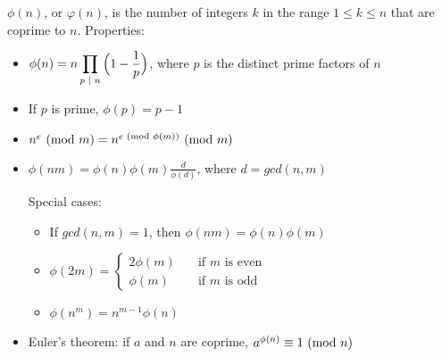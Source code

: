 
$\phi (n)$, or $\varphi (n)$, is the number of integers $k$ in the range $1 \leq k \leq n$ that are coprime to $n$. Properties:
\begin{itemize}
    \item ${\displaystyle \phi (n) = n \prod_{p \text{ } | \text{ } n} \Big(1 - \frac{1}{p} \Big)}$, where $p$ is the distinct prime factors of $n$
    \item If $p$ is prime, $\phi (p) = p-1$
    \item $n^e \text{ } ( \text{mod } m ) = n^{e \text{ } ( \text{mod } \phi(m) )} \text{ } ( \text{mod } m )$
    \item $\phi (nm) = \phi (n) \phi (m) \frac{d}{\phi (d)}$, where $d = gcd(n, m)$
    
    Special cases:
    \begin{itemize}
        \item If $gcd(n, m) = 1$, then $\phi (nm) = \phi (n) \phi (m)$
        \item 
        $\phi (2m) = 
        \begin{cases}
            2 \phi (m) &\quad\text{if } m \text{ is even} \\
            \phi (m) &\quad\text{if } m \text{ is odd}
        \end{cases}$
        \item $\phi (n^m) = n^{m-1} \phi(n)$
    \end{itemize}
    \item Euler's theorem: if $a$ and $n$ are coprime, $a^{\phi (n)} \equiv 1 \text{ } ( \text{mod } n )$
    

\end{itemize}
